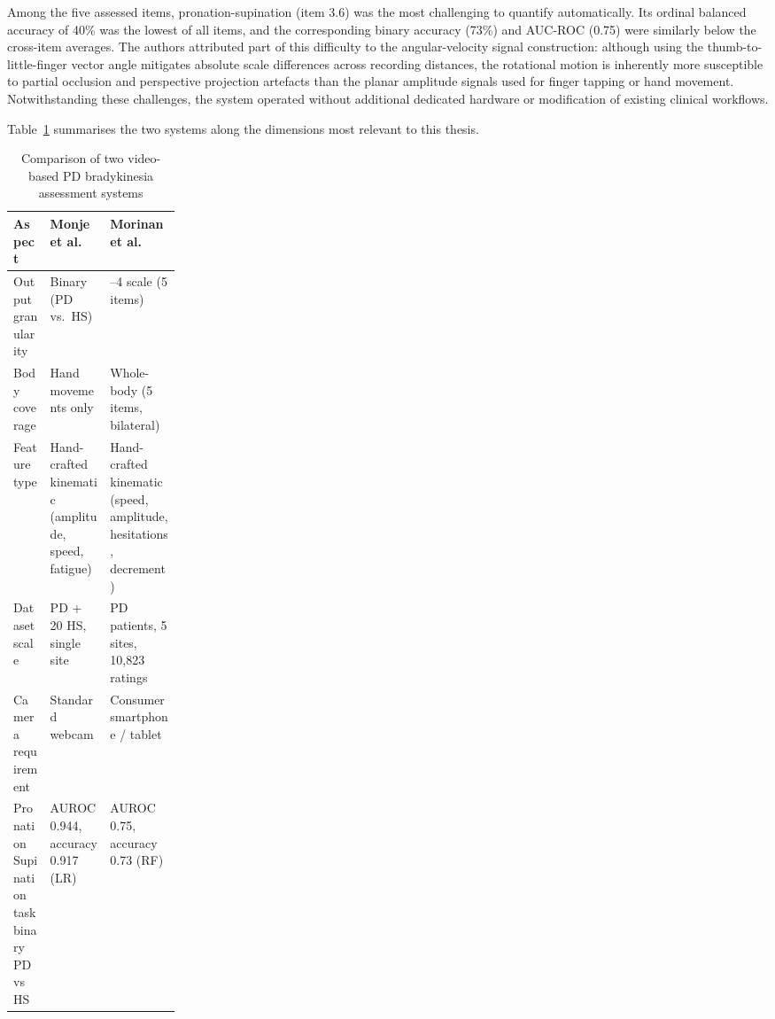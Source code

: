 Among the five assessed items, pronation-supination (item 3.6) was the most challenging to quantify automatically. Its ordinal balanced accuracy of 40\% was the lowest of all items, and the corresponding binary accuracy (73\%) and AUC-ROC (0.75) were similarly below the cross-item averages. The authors attributed part of this difficulty to the angular-velocity signal construction: although using the thumb-to-little-finger vector angle mitigates absolute scale differences across recording distances, the rotational motion is inherently more susceptible to partial occlusion and perspective projection artefacts than the planar amplitude signals used for finger tapping or hand movement. Notwithstanding these challenges, the system operated without additional dedicated hardware or modification of existing clinical workflows.

Table~\ref{tab:video_pd_comparison} summarises the two systems along the dimensions most relevant to this thesis.

\begin{table}[H]
  \centering
  \caption{Comparison of two video-based PD bradykinesia assessment systems}
  \label{tab:video_pd_comparison}
  \small
  \setlength{\tabcolsep}{6pt}
  \begin{tabularx}{\linewidth}{>{\raggedright\arraybackslash}p{0.22\linewidth}
                               >{\raggedright\arraybackslash}X
                               >{\raggedright\arraybackslash}X}
    \hline
    Aspect & Monje et al.~\cite{monje2021remote} & Morinan et al.~\cite{morinan2023computer} \\
    \hline
    Output granularity    & Binary (PD vs.\ HS) & 0--4 scale (5 items) \\
    Body coverage         & Hand movements only & Whole-body (5 items, bilateral) \\
    Feature type          & Hand-crafted kinematic (amplitude, speed, fatigue) & Hand-crafted kinematic (speed, amplitude, hesitations, decrement) \\
    Dataset scale         & 22 PD + 20 HS, single site & 628 PD patients, 5 sites, 10{,}823 ratings \\
    Camera requirement    & Standard webcam & Consumer smartphone / tablet \\
    Pronation Supination task  binary PD vs HS  & AUROC 0.944, accuracy 0.917 (LR)  & AUROC 0.75, accuracy 0.73 (RF)\\
    \hline
  \end{tabularx}
\end{table}

